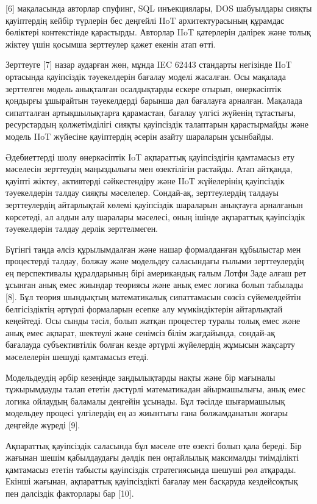 \documentclass[
]{article}
\begin{document}
{[}6{]} мақаласында авторлар спуфинг, SQL инъекциялары, DOS шабуылдары
сияқты қауіптердің кейбір түрлерін бес деңгейлі IIoT архитектурасының
құрамдас бөліктері контекстінде қарастырды. Авторлар IIoT қатерлерін
дәлірек және толық жіктеу үшін қосымша зерттеулер қажет екенін атап
өтті.

Зерттеуге {[}7{]} назар аударған жөн, мұнда IEC 62443 стандарты
негізінде IIoT ортасында қауіпсіздік тәуекелдерін бағалау моделі
жасалған. Осы мақалада зерттелген модель анықталған осалдықтарды ескере
отырып, өнеркәсіптік қондырғы ұшырайтын тәуекелдерді барынша дәл
бағалауға арналған. Мақалада сипатталған артықшылықтарға қарамастан,
бағалау үлгісі жүйенің тұтастығы, ресурстардың қолжетімділігі сияқты
қауіпсіздік талаптарын қарастырмайды және модель IIoT жүйесіне
қауіптердің әсерін азайту шараларын ұсынбайды.

Әдебиеттерді шолу өнеркәсіптік IoT ақпараттық қауіпсіздігін қамтамасыз
ету мәселесін зерттеудің маңыздылығы мен өзектілігін растайды. Атап
айтқанда, қауіпті жіктеу, активтерді сәйкестендіру және IIoT жүйелерінің
қауіпсіздік тәуекелдерін талдау сияқты мәселелер. Сондай-ақ,
зерттеулердің талдауы зерттеулердің айтарлықтай көлемі қауіпсіздік
шараларын анықтауға арналғанын көрсетеді, ал алдын алу шаралары
мәселесі, оның ішінде ақпараттық қауіпсіздік тәуекелдерін талдау дерлік
зерттелмеген.

Бүгінгі таңда әлсіз құрылымдалған және нашар формалданған құбылыстар мен
процестерді талдау, болжау және модельдеу саласындағы ғылыми
зерттеулердің ең перспективалы құралдарының бірі американдық ғалым Лотфи
Заде алғаш рет ұсынған анық емес жиындар теориясы және анық емес логика
болып табылады {[}8{]}. Бұл теория шындықтың математикалық сипаттамасын
сөзсіз сүйемелдейтін белгісіздіктің әртүрлі формаларын есепке алу
мүмкіндіктерін айтарлықтай кеңейтеді. Осы сынды тәсіл, болып жатқан
процестер туралы толық емес және анық емес ақпарат, шектеулі және
сенімсіз білім жағдайында, сондай-ақ бағалауда субъективтілік болған
кезде әртүрлі жүйелердің жұмысын жақсарту мәселелерін шешуді қамтамасыз
етеді.

Модельдеудің әрбір кезеңінде заңдылықтарды нақты және бір мағыналы
тұжырымдауды талап ететін дәстүрлі математикадан айырмашылығы, анық емес
логика ойлаудың баламалы деңгейін ұсынады. Бұл тәсілде шығармашылық
модельдеу процесі үлгілердің ең аз жиынтығы ғана болжамданатын жоғары
деңгейде жүреді {[}9{]}.

Ақпараттық қауіпсіздік саласында бұл мәселе өте өзекті болып қала
береді. Бір жағынан шешім қабылдаудағы дәлдік пен оңтайлылық максималды
тиімділікті қамтамасыз ететін табысты қауіпсіздік стратегиясында шешуші
рөл атқарады. Екінші жағынан, ақпараттық қауіпсіздікті бағалау мен
басқаруда кездейсоқтық пен дәлсіздік факторлары бар {[}10{]}.
\end{document}
